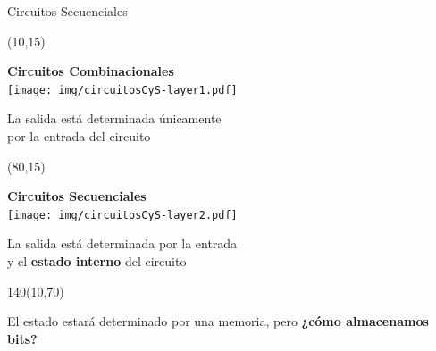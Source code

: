 \documentclass[aspectratio=169]{beamer}
\begin{document}
\begin{frame}[t]{Circuitos Secuenciales}
    \begin{textblock}{65}(10,15)
    \begin{center}
    \textbf{Circuitos Combinacionales}\\
    \vspace{0.5cm}
    \texttt{[image: img/circuitosCyS-layer1.pdf]}
    \end{center}
    La salida está determinada \'unicamente\\ por la entrada del circuito
    \end{textblock}
    \begin{textblock}{65}(80,15)
    \begin{center}
    \textbf{Circuitos Secuenciales}\\
    \vspace{0.5cm}
    \texttt{[image: img/circuitosCyS-layer2.pdf]}
    \end{center}
    La salida está determinada por la entrada\\ y el \textbf{estado interno} del circuito
    \end{textblock}
    \begin{textblock}{140}(10,70)
    \begin{center}
     \color{verdeuca} El estado estará determinado por una memoria, pero \color{naranjauca} \textbf{¿cómo almacenamos bits?}
    \end{center}
    \end{textblock}
\end{frame}
\end{document}
